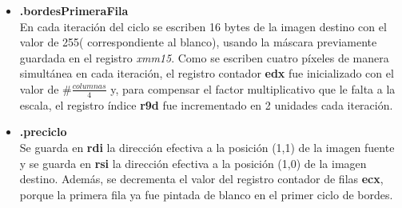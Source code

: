 \documentclass[a4paper]{article}
\begin{document}
\begin{itemize}
	\item \textbf{.bordesPrimeraFila}\\
	 En cada iteración del ciclo se escriben 16 bytes de la imagen destino con el valor de 255( correspondiente al blanco), usando la máscara previamente guardada en el registro \textit{xmm15}. Como se escriben cuatro píxeles de manera simultánea en cada iteración, el registro contador \textbf{edx} fue inicializado con el valor de $\#\frac{columnas}{4}$ y, para compensar el factor multiplicativo que le falta a la escala, el registro índice \textbf{r9d} fue incrementado en 2 unidades cada iteración.  
	
	\item \textbf{.preciclo}\\
	Se guarda en \textbf{rdi} la dirección efectiva a la posición (1,1) de la imagen fuente y se guarda en \textbf{rsi} la dirección efectiva a la posición (1,0) de la imagen destino. Además, se decrementa el valor del registro contador de filas \textbf{ecx}, porque la primera fila ya fue pintada de blanco en el primer ciclo de bordes.  
	

\end{itemize}
\end{document}
